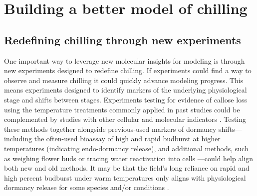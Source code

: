 \documentclass[11pt]{article}
\begin{document}

\section*{Building a better model of chilling} %

\subsection*{Redefining chilling through new experiments} 
One important way to leverage new molecular insights for modeling is through new experiments designed to redefine chilling. If experiments could find a way to observe and measure chilling it could quickly advance modeling progress. This means experiments  designed to identify markers of the underlying physiological stage and shifts between stages. Experiments testing for evidence of callose loss using the temperature treatments commonly applied in past studies \citep{ospreebbms} could be complemented by studies with other cellular and molecular indicators \citep{yu2024building}. Testing these methods together alongside previous-used markers of dormancy shifts---including the often-used bioassay of high and rapid budburst at higher temperatures (indicating endo-dormancy release), and additional methods, such as weighing flower buds \citep{chuine2016} or tracing water reactivation into cells \citep{faust1991bound,Kalcsits2009,walde2024stable}---could help align both new and old methods. 
It may be that the field's long reliance on rapid and high percent budburst under warm temperatures only aligns with physiological dormancy release for some species and/or conditions \citep{fouche2023transport,walde2024stable}. 
\end{document}
